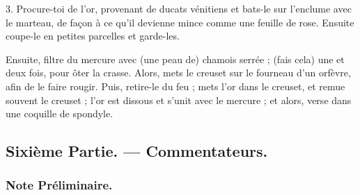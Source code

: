 \documentclass[a4paper, 11pt, oneside, polutonikogreek, french]{article}
\begin{document}
3. Procure-toi de l'or, provenant de ducats vénitiens et bats-le sur l'enclume avec le marteau, de façon à ce qu'il devienne mince comme une feuille de rose. Ensuite coupe-le en petites parcelles et garde-les.

Ensuite, filtre du mercure avec (une peau de) chamois serrée ; (fais cela) une et deux fois, pour ôter la crasse. Alors, mets le creuset sur le fourneau d'un orfèvre, afin de le faire rougir. Puis, retire-le du feu ; mets l'or dans le creuset, et remue souvent le creuset ; l'or est dissous et s'unit avec le mercure ; et alors, verse dans une coquille de spondyle.

\bigskip
\centerline{\EightStarTaper}
\centerline{\EightStarTaper\EightStarTaper}
\bigskip
\clearpage
\subsection{Sixième Partie. --- Commentateurs.}
\subsubsection{Note Préliminaire.}
\end{document}
